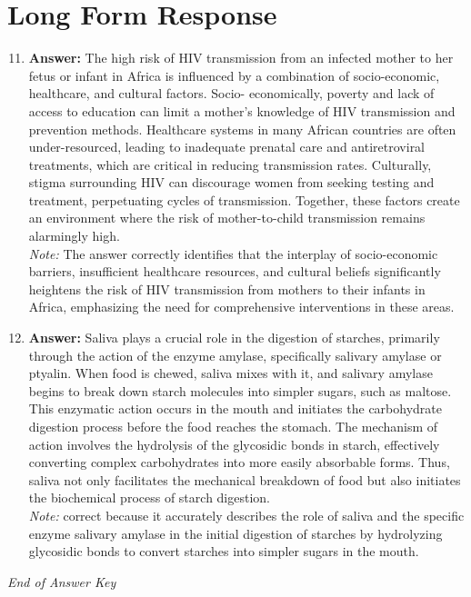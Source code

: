 \documentclass[12pt]{article}
\begin{document}
\section*{Long Form Response}
\begin{enumerate}[label=\arabic*.]
\setcounter{enumi}{10}
\item \textbf{Answer:} The high risk of HIV transmission from an infected mother to her fetus or infant in Africa is influenced by a combination of socio-economic, healthcare, and cultural factors. Socio- economically, poverty and lack of access to education can limit a mother's knowledge of HIV transmission and prevention methods. Healthcare systems in many African countries are often under-resourced, leading to inadequate prenatal care and antiretroviral treatments, which are critical in reducing transmission rates. Culturally, stigma surrounding HIV can discourage women from seeking testing and treatment, perpetuating cycles of transmission. Together, these factors create an environment where the risk of mother-to-child transmission remains alarmingly high.
\\ \textit{Note:} The answer correctly identifies that the interplay of socio-economic barriers, insufficient healthcare resources, and cultural beliefs significantly heightens the risk of HIV transmission from mothers to their infants in Africa, emphasizing the need for comprehensive interventions in these areas.
\item \textbf{Answer:} Saliva plays a crucial role in the digestion of starches, primarily through the action of the enzyme amylase, specifically salivary amylase or ptyalin. When food is chewed, saliva mixes with it, and salivary amylase begins to break down starch molecules into simpler sugars, such as maltose. This enzymatic action occurs in the mouth and initiates the carbohydrate digestion process before the food reaches the stomach. The mechanism of action involves the hydrolysis of the glycosidic bonds in starch, effectively converting complex carbohydrates into more easily absorbable forms. Thus, saliva not only facilitates the mechanical breakdown of food but also initiates the biochemical process of starch digestion.
\\ \textit{Note:} correct because it accurately describes the role of saliva and the specific enzyme salivary amylase in the initial digestion of starches by hydrolyzing glycosidic bonds to convert starches into simpler sugars in the mouth.
\end{enumerate}

\vfill
\noindent\textit{End of Answer Key}
\end{document}
